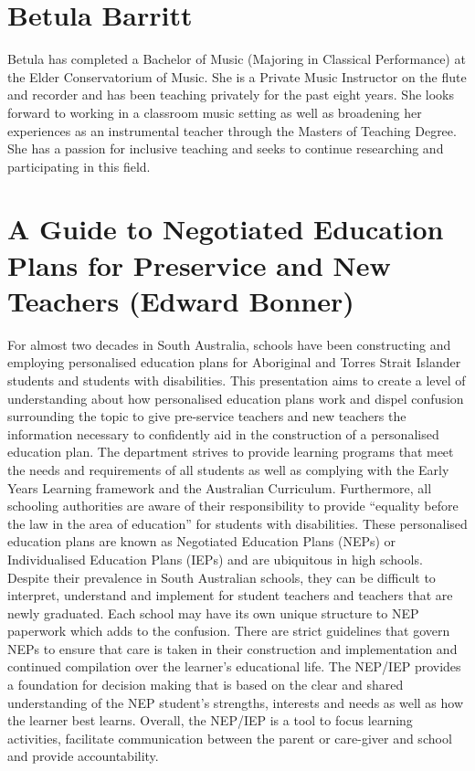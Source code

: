 \documentclass[twoside,14pt,a4paper,notitlepage]{memoir}
\begin{document}
\section*{Betula Barritt}

Betula has completed a Bachelor of Music (Majoring in Classical Performance) at the Elder Conservatorium of Music. She is a Private Music Instructor on the flute and recorder and has been teaching privately for the past eight years. She looks forward to working in a classroom music setting as well as broadening her experiences as an instrumental teacher through the Masters of Teaching Degree. She has a passion for inclusive teaching and seeks to continue researching and participating in this field.



\section*{A Guide to Negotiated Education Plans for Preservice and New Teachers (Edward Bonner)}
\label{aut:bonner}

For almost two decades in South Australia, schools have been constructing and employing personalised education plans for Aboriginal and Torres Strait Islander students and students with disabilities. This presentation aims to create a level of understanding about how personalised education plans work and dispel confusion surrounding the topic to give pre-service teachers and new teachers the information necessary to confidently aid in the construction of a personalised education plan. The department strives to provide learning programs that meet the needs and requirements of all students as well as complying with the Early Years Learning framework and the Australian Curriculum. Furthermore, all schooling authorities are aware of their responsibility to provide “equality before the law in the area of education” for students with disabilities. These personalised education plans are known as Negotiated Education Plans (NEPs) or Individualised Education Plans (IEPs) and are ubiquitous in high schools. Despite their prevalence in South Australian schools, they can be difficult to interpret, understand and implement for student teachers and teachers that are newly graduated. Each school may have its own unique structure to NEP paperwork which adds to the confusion. There are strict guidelines that govern NEPs to ensure that care is taken in their construction and implementation and continued compilation over the learner’s educational life. The NEP/IEP provides a foundation for decision making that is based on the clear and shared understanding of the NEP student’s strengths, interests and needs as well as how the learner best learns. Overall, the NEP/IEP is a tool to focus learning activities, facilitate communication between the parent or care-giver and school and provide accountability.
\end{document}
